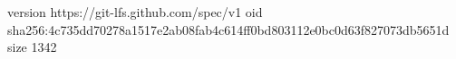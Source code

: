 version https://git-lfs.github.com/spec/v1
oid sha256:4c735dd70278a1517e2ab08fab4c614ff0bd803112e0bc0d63f827073db5651d
size 1342
